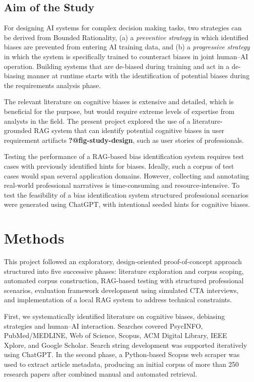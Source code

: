 \documentclass[
  manuscript,
  anonymous,
  review]{acmart}
\begin{document}
\subsection{Aim of the Study}\label{aim-of-the-study}

For designing AI systems for complex decision making tasks, two
strategies can be derived from Bounded Rationality, (a) a
\emph{preventive strategy} in which identified biases are prevented from
entering AI training data, and (b) a \emph{progressive strategy} in
which the system is specifically trained to counteract biases in joint
human--AI operation. Building systems that are de-biased during training
and act in a de-biasing manner at runtime starts with the identification
of potential biases during the requirements analysis phase.

The relevant literature on cognitive biases is extensive and detailed,
which is beneficial for the purpose, but would require extreme levels of
expertise from analysts in the field. The present project explored the
use of a literature-grounded RAG system that can identify potential
cognitive biases in user requirement artifacts
\textbf{?@fig-study-design}, such as user stories of professionals.

Testing the performance of a RAG-based bias identification system
requires test cases with previously identified hints for biases.
Ideally, such a corpus of test cases would span several application
domains. However, collecting and annotating real-world professional
narratives is time-consuming and resource-intensive. To test the
feasibility of a bias identification system structured professional
scenarios were generated using ChatGPT, with intentional seeded hints
for cognitive biases.

\section{Methods}\label{methods}

This project followed an exploratory, design-oriented proof-of-concept
approach structured into five successive phases: literature exploration
and corpus scoping, automated corpus construction, RAG-based testing
with structured professional scenarios, evaluation framework development
using simulated CTA interviews, and implementation of a local RAG system
to address technical constraints.

First, we systematically identified literature on cognitive biases,
debiasing strategies and human--AI interaction. Searches covered
PsycINFO, PubMed/MEDLINE, Web of Science, Scopus, ACM Digital Library,
IEEE Xplore, and Google Scholar. Search string development was supported
iteratively using ChatGPT. In the second phase, a Python-based Scopus
web scraper was used to extract article metadata, producing an initial
corpus of more than 250 research papers after combined manual and
automated retrieval.
\end{document}
